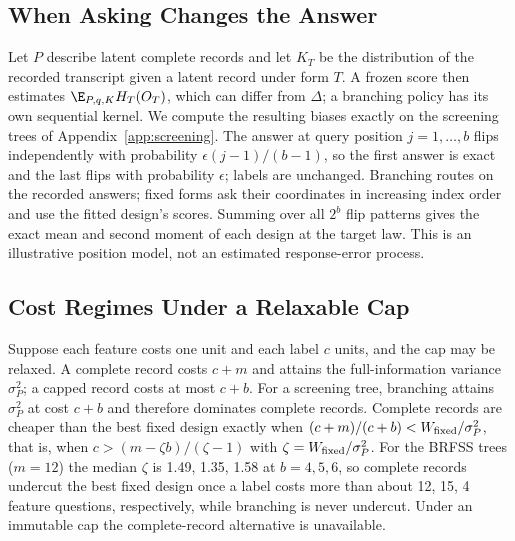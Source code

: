 \subsection{When Asking Changes the Answer}\label{app:measurement}
Let $P$ describe latent complete records and let $K_T$ be the distribution of the recorded transcript given a latent record under form $T$. A frozen score then estimates $\E_{P,q,K}H_T(O_T)$, which can differ from $\Delta$; a branching policy has its own sequential kernel. We compute the resulting biases exactly on the screening trees of Appendix~\ref{app:screening}. The answer at query position $j=1,\ldots,b$ flips independently with probability $\epsilon(j-1)/(b-1)$, so the first answer is exact and the last flips with probability $\epsilon$; labels are unchanged. Branching routes on the recorded answers; fixed forms ask their coordinates in increasing index order and use the fitted design's scores. Summing over all $2^b$ flip patterns gives the exact mean and second moment of each design at the target law. This is an illustrative position model, not an estimated response-error process.


\subsection{Cost Regimes Under a Relaxable Cap}\label{app:costchoice}
Suppose each feature costs one unit and each label $c$ units, and the cap may be relaxed. A complete record costs $c+m$ and attains the full-information variance $\sigma_P^2$; a capped record costs at most $c+b$. For a screening tree, branching attains $\sigma_P^2$ at cost $c+b$ and therefore dominates complete records. Complete records are cheaper than the best fixed design exactly when $(c+m)/(c+b)<W_{\rm fixed}/\sigma_P^2$, that is, when $c>(m-\zeta b)/(\zeta-1)$ with $\zeta=W_{\rm fixed}/\sigma_P^2$. For the BRFSS trees ($m=12$) the median $\zeta$ is 1.49, 1.35, 1.58 at $b=4, 5, 6$, so complete records undercut the best fixed design once a label costs more than about 12, 15, 4 feature questions, respectively, while branching is never undercut. Under an immutable cap the complete-record alternative is unavailable.
